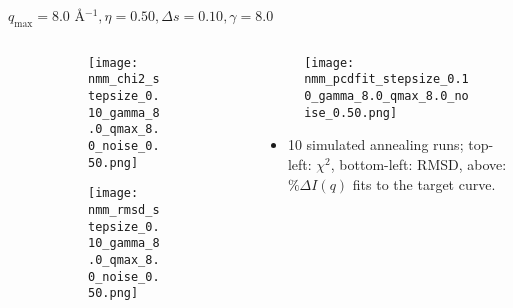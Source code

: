 \documentclass{beamer}
\begin{document}
\begin{frame}{$ q_{\textrm{max}}=8.0 $ \AA $^{-1}, \eta=0.50, \Delta s=0.10, \gamma=8.0$}
	\begin{columns}
		\begin{column}{.5\textwidth}
			\begin{figure}[H]
			\centering
			\begin{subfigure}[b]{\textwidth}
				\centering
				\texttt{[image: nmm\_chi2\_stepsize\_0.10\_gamma\_8.0\_qmax\_8.0\_noise\_0.50.png]}
				\label{fig:}
			\end{subfigure}
			\begin{subfigure}[b]{\textwidth}
				\centering
				\texttt{[image: nmm\_rmsd\_stepsize\_0.10\_gamma\_8.0\_qmax\_8.0\_noise\_0.50.png]}
				\label{fig:}
			\end{subfigure}
			\end{figure}
		\end{column}
		\begin{column}{.5\textwidth}
			\begin{figure}[H]
				\centering
				\texttt{[image: nmm\_pcdfit\_stepsize\_0.10\_gamma\_8.0\_qmax\_8.0\_noise\_0.50.png]}
				\label{fig:}
			\end{figure}
			\begin{itemize}
				\item 10 simulated annealing runs; top-left: $\chi^2$, bottom-left: RMSD, above: $\%\Delta I(q)$ fits to the target curve.
			\end{itemize}
		\end{column}
	\end{columns}
\end{frame}
 
\end{document}

